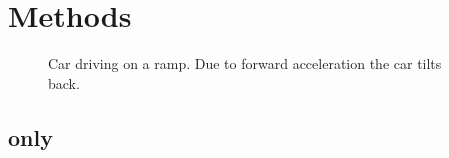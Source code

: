\chapter{Methods}
\label{ch:Methods}

\begin{figure}[htpb]
    \centering
	
	\caption{Car driving on a ramp. Due to forward acceleration the car tilts back.}
	\label{fig:tikz_car_tilt}
\end{figure}


\section{ only}
